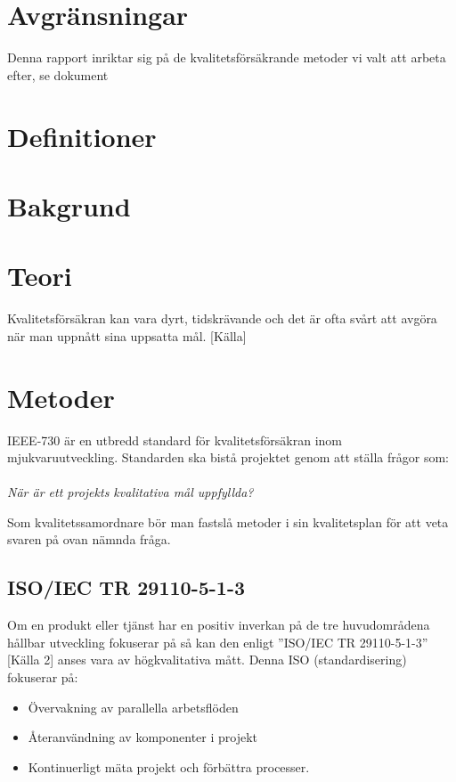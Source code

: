 \section{Avgränsningar}
Denna rapport inriktar sig på de kvalitetsförsäkrande metoder vi valt att arbeta efter, se dokument %

\section{Definitioner}

\section{Bakgrund}

\section{Teori}

Kvalitetsförsäkran kan vara dyrt, tidskrävande och det är ofta svårt att avgöra när man uppnått sina uppsatta mål. [Källa]
\section{Metoder}

IEEE-730 är en utbredd standard för kvalitetsförsäkran inom mjukvaruutveckling. Standarden ska bistå projektet genom att ställa frågor som:
\\ \\
\emph{När är ett projekts kvalitativa mål uppfyllda?}

Som kvalitetssamordnare bör man fastslå metoder i sin kvalitetsplan för att veta svaren på ovan nämnda fråga. \\

\subsection{ISO/IEC TR 29110-5-1-3}
Om en produkt eller tjänst har en positiv inverkan på de tre huvudområdena hållbar utveckling fokuserar på så kan den enligt ”ISO/IEC TR 29110-5-1-3” [Källa 2] anses vara av högkvalitativa mått.  Denna ISO (standardisering) fokuserar på: 

\begin{itemize}
	\item Övervakning av parallella arbetsflöden
	\item Återanvändning av komponenter i projekt
	\item Kontinuerligt mäta projekt och förbättra processer.
\end{itemize}

